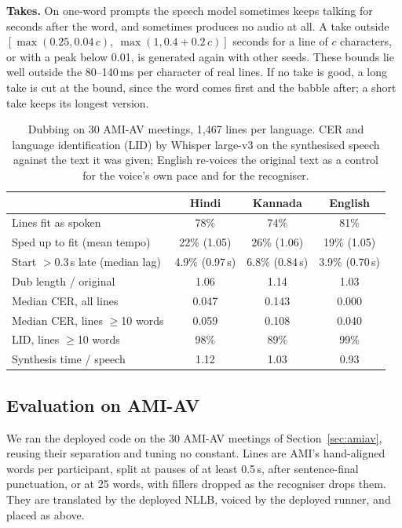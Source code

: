 \textbf{Takes.} On one-word prompts the speech model sometimes keeps talking for seconds after the word, and sometimes produces no audio at all. A take outside $[\max(0.25, 0.04\,c),\ \max(1, 0.4+0.2\,c)]$ seconds for a line of $c$ characters, or with a peak below 0.01, is generated again with other seeds. These bounds lie well outside the 80--140\,ms per character of real lines. If no take is good, a long take is cut at the bound, since the word comes first and the babble after; a short take keeps its longest version.

\begin{table}[t]
\centering
\caption{Dubbing on 30 AMI-AV meetings, 1,467 lines per language. CER and language identification (LID) by Whisper large-v3 on the synthesised speech against the text it was given; English re-voices the original text as a control for the voice's own pace and for the recogniser.}
\label{tab:dub}
\footnotesize
\setlength{\tabcolsep}{3.2pt}
\begin{tabular}{@{}lccc@{}}
\toprule
 & Hindi & Kannada & English \\
\midrule
Lines fit as spoken & 78\% & 74\% & 81\% \\
Sped up to fit (mean tempo) & 22\% (1.05) & 26\% (1.06) & 19\% (1.05) \\
Start $>$0.3\,s late (median lag) & 4.9\% (0.97\,s) & 6.8\% (0.84\,s) & 3.9\% (0.70\,s) \\
Dub length / original & 1.06 & 1.14 & 1.03 \\
\midrule
Median CER, all lines & 0.047 & 0.143 & 0.000 \\
Median CER, lines $\geq$10 words & 0.059 & 0.108 & 0.040 \\
LID, lines $\geq$10 words & 98\% & 89\% & 99\% \\
\midrule
Synthesis time / speech & 1.12 & 1.03 & 0.93 \\
\bottomrule
\end{tabular}
\end{table}

\subsection{Evaluation on AMI-AV}
We ran the deployed code on the 30 AMI-AV meetings of Section~\ref{sec:amiav}, reusing their separation and tuning no constant. Lines are AMI's hand-aligned words per participant, split at pauses of at least 0.5\,s, after sentence-final punctuation, or at 25 words, with fillers dropped as the recogniser drops them. They are translated by the deployed NLLB, voiced by the deployed runner, and placed as above.

